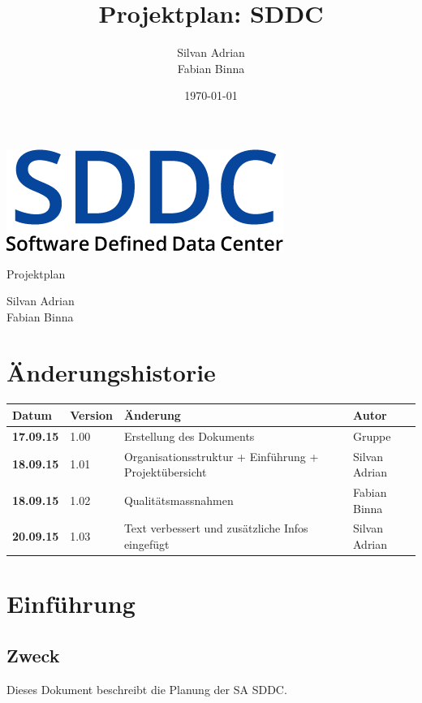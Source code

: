 \documentclass[11pt]{scrartcl}
\title{Projektplan: SDDC}
\author{Silvan Adrian \\ Fabian Binna}
\date{\today{}}
\begin{document}
\def\arraystretch{1.5}
\begin{titlepage}
\begin{center}
\vspace{10em}
\includegraphics[scale=2]{SDDC}
\vspace{10em}
\end{center}
\begin{center}
\huge {Projektplan}
\end{center}
\begin{center}
\vspace{10em}
\LARGE {Silvan Adrian} \\
\LARGE {Fabian Binna}
\end{center}

\end{titlepage}

\newpage
\section{Änderungshistorie}
\begin{tabularx}{\textwidth}{l l X l}
\textbf{Datum} & \textbf{Version} & \textbf{Änderung}  & \textbf{Autor} \\
\hline
\textbf{17.09.15} & 1.00 & Erstellung des Dokuments & Gruppe \\
\textbf{18.09.15} & 1.01 & Organisationsstruktur + Einführung + 
Projektübersicht & Silvan Adrian\\
\textbf{18.09.15} & 1.02 & Qualitätsmassnahmen & Fabian Binna\\
\textbf{20.09.15} & 1.03 &  Text verbessert und zusätzliche Infos eingefügt & Silvan Adrian\\

\end{tabularx}

\newpage
\tableofcontents
\newpage

\section{Einführung}
\subsection{Zweck}
Dieses Dokument beschreibt die Planung der SA SDDC.
\end{document}

